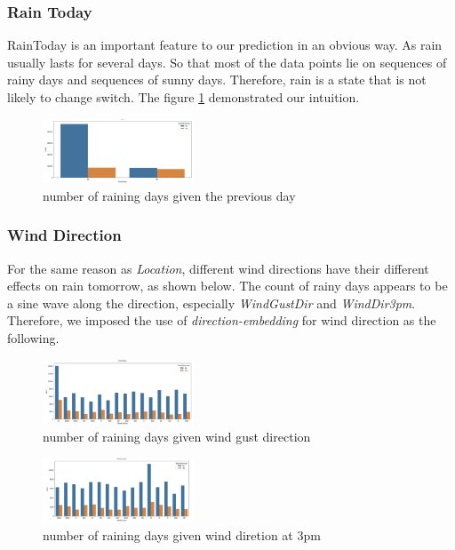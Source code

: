 \documentclass{article}
\begin{document}
\subsubsection{Rain Today}
RainToday is an important feature to our prediction in an obvious way. As rain usually lasts for several days. So that most of the data points lie on sequences of rainy days and sequences of sunny days. Therefore, rain is a state that is not likely to change switch. The figure \ref{fig:raintoday} demonstrated our intuition.

\begin{figure}[h!]
\centering
\includegraphics[width=0.4\textwidth]{raintoday.png}
\caption{number of raining days given the previous day}
\label{fig:raintoday}
\end{figure}

\subsubsection{Wind Direction}
For the same reason as \textit{Location}, different wind directions have their different effects on rain tomorrow, as shown below. The count of rainy days appears to be a sine wave along the direction, especially \textit{WindGustDir} and \textit{WindDir3pm}. Therefore, we imposed the use of \textit{direction-embedding} for wind direction as the following.

\begin{figure}[h!]
\centering
\includegraphics[width=0.4\textwidth]{windgustdir.png}
\caption{number of raining days given wind gust direction}
\label{fig:windgustdir}
\end{figure}

\begin{figure}[h!]
\centering
\includegraphics[width=0.4\textwidth]{winddir3pm.png}
\caption{number of raining days given wind diretion at 3pm}
\label{fig:winddir3pm}
\end{figure}
\end{document}
